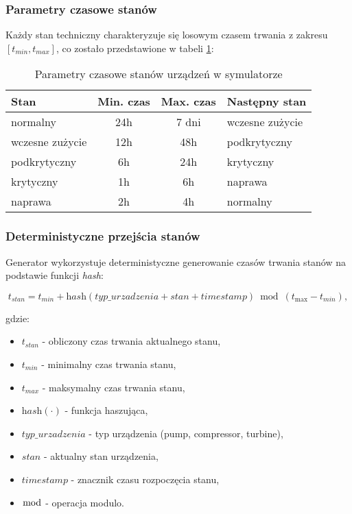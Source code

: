\subsubsection{Parametry czasowe stanów}

Każdy stan techniczny charakteryzuje się losowym czasem trwania z zakresu $[t_{min}, t_{max}]$, co zostało przedstawione w tabeli \ref{tab:parametry_stanow_sim}:

\begin{table}[h]
\centering
\begin{tabular}{|l|c|c|l|}
\hline
\textbf{Stan} & \textbf{Min. czas} & \textbf{Max. czas} & \textbf{Następny stan} \\
\hline
normalny & 24h & 7 dni & wczesne zużycie \\
wczesne zużycie & 12h & 48h & podkrytyczny \\
podkrytyczny & 6h & 24h & krytyczny \\
krytyczny & 1h & 6h & naprawa \\
naprawa & 2h & 4h & normalny \\
\hline
\end{tabular}
\caption{Parametry czasowe stanów urządzeń w symulatorze}
\label{tab:parametry_stanow_sim}
\end{table}

\newpage

\subsubsection{Deterministyczne przejścia stanów}

Generator wykorzystuje deterministyczne generowanie czasów trwania stanów na podstawie funkcji \textit{hash}:

\begin{equation}
t_{stan} = t_{min} + \textit{hash}(typ\_urzadzenia + stan + timestamp) \bmod (t_{\text{max}} - t_{min}),
\end{equation}

gdzie:
\begin{itemize}
    \item $t_{stan}$ - obliczony czas trwania aktualnego stanu,
    \item $t_{min}$ - minimalny czas trwania stanu,
    \item $t_{max}$ - maksymalny czas trwania stanu,
    \item $\textit{hash}(\cdot)$ - funkcja haszująca,
    \item $typ\_urzadzenia$ - typ urządzenia (pump, compressor, turbine),
    \item $stan$ - aktualny stan urządzenia,
    \item $timestamp$ - znacznik czasu rozpoczęcia stanu,
    \item $\bmod$ - operacja modulo.
\end{itemize}

